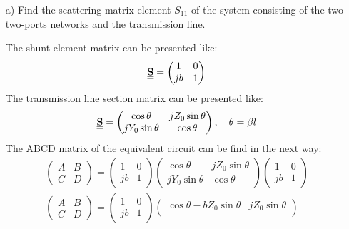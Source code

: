 \documentclass[12pt, letterpaper]{article}
\begin{document}
\begin{itemize}
  \item [a)] Find the scattering matrix element $S_{11}$ of the system consisting of the two two-ports networks and the transmission line.

  {\color{blue}The shunt element matrix can be presented like:}
  \begin{align}
    \underline{\underline{\vb{S}}}=
    \begin{pmatrix}
      1 & 0\\
      jb & 1
    \end{pmatrix}
  \end{align}
  {\color{blue}The transmission line section matrix can be presented like:}
  \begin{align}
    \underline{\underline{\vb{S}}}=
    \begin{pmatrix}
      \cos\theta & jZ_0\sin\theta\\
      jY_0\sin\theta & \cos\theta
    \end{pmatrix}, \quad \theta=\beta l
  \end{align}
  {\color{blue}The ABCD matrix of the equivalent circuit can be find in the next way:}
  \begin{align}
    \begin{pmatrix}
      A & B\\
      C & D
    \end{pmatrix}
    =
    \begin{pmatrix}
      1 & 0\\
      jb & 1
    \end{pmatrix}
    \begin{pmatrix}
      \cos\theta & jZ_0\sin\theta\\
      jY_0\sin\theta & \cos\theta
    \end{pmatrix}
    \begin{pmatrix}
      1 & 0\\
      jb & 1
    \end{pmatrix}
    \\
    \begin{pmatrix}
      A & B\\
      C & D
    \end{pmatrix}
    =
    \begin{pmatrix}
      1 & 0\\
      jb & 1
    \end{pmatrix}
    \begin{pmatrix}
      \cos\theta - bZ_0\sin\theta& jZ_0\sin\theta\\

\end{pmatrix}
\end{align}
\end{itemize}
\end{document}
